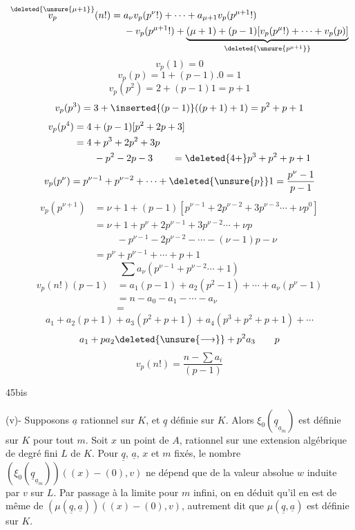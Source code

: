 \[
\begin{aligned}
\overset{\deleted{\unsure{\mu+1}}}{v_p}(n!)={}&a_\nu v_p(p^\nu!)+\cdots+a_{\mu+1}v_p(p^{\mu+1}!)\\
&-v_p(p^{\mu+1}!)+\underbrace{(\mu+1)+(p-1)[v_p(p^\mu!)+\cdots+v_p(p)]}_{\deleted{\unsure{p^{\mu+1}}}}
\end{aligned}
\]
\[
v_p(1)=0
\]
\[
v_p(p)=1+(p-1).0=1
\]
\[
v_p(p^2)=2+(p-1)1=p+1
\]
\[
v_p(p^3)=3+\inserted{(p-1)}((p+1)+1)=p^2+p+1
\]
\[
\begin{aligned}
v_p(p^4)&=4+(p-1)[p^2+2p+3]\\
&=4+p^3+2p^2+3p\\
&\phantom{={}}\quad-p^2-2p-3\qquad=\deleted{4+}p^3+p^2+p+1
\end{aligned}
\]
\[
v_p(p^\nu)=p^{\nu-1}+p^{\nu-2}+\cdots+\deleted{\unsure{p}}1=\frac{p^\nu-1}{p-1}
\]
\[
\begin{aligned}
v_p(p^{\nu+1})&=\nu+1+(p-1)[p^{\nu-1}+2p^{\nu-2}+3p^{\nu-3}\cdots+\nu p^0]\\
&=\nu+1+p^\nu+2p^{\nu-1}+3p^{\nu-2}\cdots+\nu p\\
&\phantom{={}}\quad-p^{\nu-1}-2p^{\nu-2}-\cdots-(\nu-1)p-\nu\\
&=p^\nu+p^{\nu-1}+\cdots+p+1
\end{aligned}
\]
\[
\sum a_\nu(p^{\nu-1}+p^{\nu-2}\cdots+1)
\]
\[
\begin{aligned}
v_p(n!)(p-1)&=a_1(p-1)+a_2(p^2-1)+\cdots+a_\nu(p^\nu-1)\\
&=n-a_0-a_1-\cdots-a_\nu\\
&=
\end{aligned}
\]
\[
\boxed{a_1+a_2(p+1)+a_3(p^2+p+1)+a_4(p^3+p^2+p+1)+\cdots}
\]
\[
a_1+pa_2\deleted{\unsure{\longrightarrow}}+p^2a_3\qquad p
\]
\[
\boxed{\boxed{v_p(n!)=\frac{n-\sum a_i}{(p-1)}}}
\]


45bis

(v)- Supposons $\underline{a}$ rationnel sur $K$, et $\underline{q}$ définie sur $K$. Alors $\xi_0(\underline{q}_{\underline{a}_m})$ est définie sur $K$ pour tout $m$. Soit $x$ un point de $A$, rationnel sur une extension algébrique de degré fini $L$ de $K$. Pour $\underline{q}$, $\underline{a}$, $x$ et $m$ fixés, le nombre $(\xi_0(\underline{q}_{\underline{a}_m}))((x)-(0),v)$ ne dépend que de la valeur absolue $w$ induite par $v$ sur $L$. Par passage à  la limite pour $m$ infini, on en déduit qu'il en est de même de $(\mu(\underline{q},\underline{a}))((x)-(0),v)$, autrement dit que $\mu(\underline{q},\underline{a})$ est définie sur $K$.


